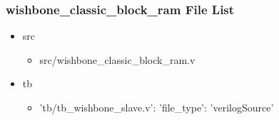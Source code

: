\subsubsection{wishbone\_classic\_block\_ram File List}
\begin{itemize}
\item src
	\begin{itemize}
	\item src/wishbone\_classic\_block\_ram.v
	\end{itemize}
\item tb
	\begin{itemize}
	\item {'tb/tb\_wishbone\_slave.v': {'file\_type': 'verilogSource'}}
	\end{itemize}
\end{itemize}
